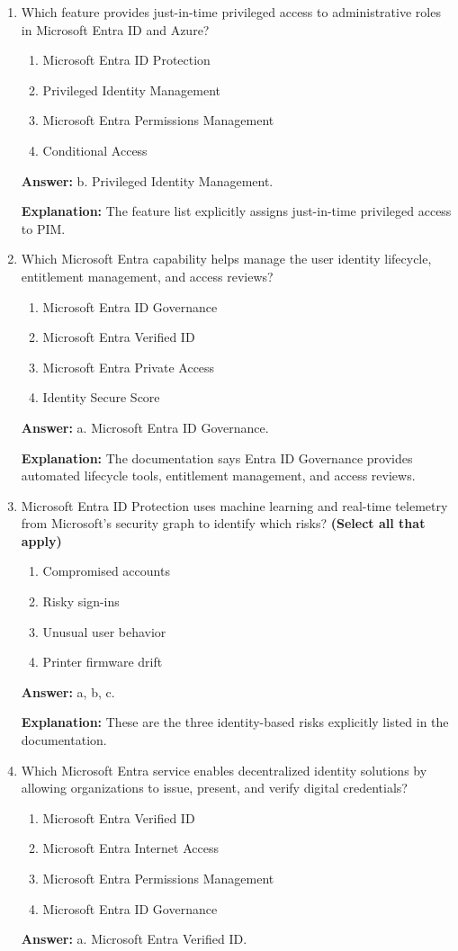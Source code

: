 \documentclass[10pt]{article}
\begin{document}
\begin{enumerate}[leftmargin=*]
\item Which feature provides just-in-time privileged access to administrative roles in Microsoft Entra ID and Azure?
\begin{enumerate}[label=\alph*., leftmargin=1.5em]
\item Microsoft Entra ID Protection
\item Privileged Identity Management
\item Microsoft Entra Permissions Management
\item Conditional Access
\end{enumerate}
\textbf{Answer:} b. Privileged Identity Management.

\textbf{Explanation:} The feature list explicitly assigns just-in-time privileged access to PIM.

\item Which Microsoft Entra capability helps manage the user identity lifecycle, entitlement management, and access reviews?
\begin{enumerate}[label=\alph*., leftmargin=1.5em]
\item Microsoft Entra ID Governance
\item Microsoft Entra Verified ID
\item Microsoft Entra Private Access
\item Identity Secure Score
\end{enumerate}
\textbf{Answer:} a. Microsoft Entra ID Governance.

\textbf{Explanation:} The documentation says Entra ID Governance provides automated lifecycle tools, entitlement management, and access reviews.

\item Microsoft Entra ID Protection uses machine learning and real-time telemetry from Microsoft’s security graph to identify which risks? \textbf{(Select all that apply)}
\begin{enumerate}[label=\alph*., leftmargin=1.5em]
\item Compromised accounts
\item Risky sign-ins
\item Unusual user behavior
\item Printer firmware drift
\end{enumerate}
\textbf{Answer:} a, b, c.

\textbf{Explanation:} These are the three identity-based risks explicitly listed in the documentation.

\item Which Microsoft Entra service enables decentralized identity solutions by allowing organizations to issue, present, and verify digital credentials?
\begin{enumerate}[label=\alph*., leftmargin=1.5em]
\item Microsoft Entra Verified ID
\item Microsoft Entra Internet Access
\item Microsoft Entra Permissions Management
\item Microsoft Entra ID Governance
\end{enumerate}
\textbf{Answer:} a. Microsoft Entra Verified ID.


\end{enumerate}
\end{document}
